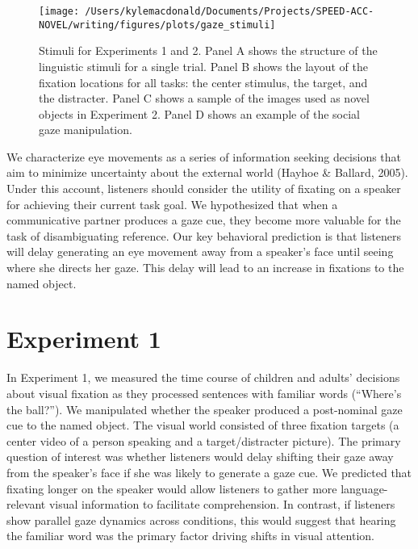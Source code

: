 \documentclass[10pt, letterpaper]{article}
\newenvironment{CodeChunk}{}{}
\begin{document}
\begin{CodeChunk}
\begin{figure*}[h]

{\centering \texttt{[image: /Users/kylemacdonald/Documents/Projects/SPEED-ACC-NOVEL/writing/figures/plots/gaze\_stimuli]} 

}

\caption[Stimuli for Experiments 1 and 2]{Stimuli for Experiments 1 and 2. Panel A shows the structure of the linguistic stimuli for a single trial. Panel B shows the layout of the fixation locations for all tasks: the center stimulus, the target, and the distracter. Panel C shows a sample of the images used as novel objects in Experiment 2. Panel D shows an example of the social gaze manipulation.}\label{fig:gaze-stimuli}
\end{figure*}
\end{CodeChunk}

We characterize eye movements as a series of information seeking
decisions that aim to minimize uncertainty about the external world
(Hayhoe \& Ballard, 2005). Under this account, listeners should consider
the utility of fixating on a speaker for achieving their current task
goal. We hypothesized that when a communicative partner produces a gaze
cue, they become more valuable for the task of disambiguating reference.
Our key behavioral prediction is that listeners will delay generating an
eye movement away from a speaker's face until seeing where she directs
her gaze. This delay will lead to an increase in fixations to the named
object.

\hypertarget{experiment-1}{%
\section{Experiment 1}\label{experiment-1}}

In Experiment 1, we measured the time course of children and adults'
decisions about visual fixation as they processed sentences with
familiar words (``Where's the ball?''). We manipulated whether the
speaker produced a post-nominal gaze cue to the named object. The visual
world consisted of three fixation targets (a center video of a person
speaking and a target/distracter picture). The primary question of
interest was whether listeners would delay shifting their gaze away from
the speaker's face if she was likely to generate a gaze cue. We
predicted that fixating longer on the speaker would allow listeners to
gather more language-relevant visual information to facilitate
comprehension. In contrast, if listeners show parallel gaze dynamics
across conditions, this would suggest that hearing the familiar word was
the primary factor driving shifts in visual attention.
\end{document}
